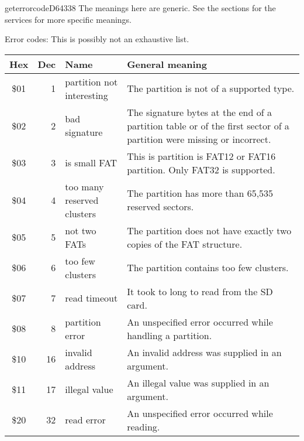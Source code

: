 \begin{hyppotrap}{geterrorcode}{D643}{38}
  The meanings here are generic. See the sections for the services for more
  specific meanings.
\item [Error codes:] This is possibly not an exhaustive list.
{
  \begin{longtable}{|c|r|l|p{8cm}|}
    \hline
    \textbf{Hex} & \textbf{Dec} & \textbf{Name} & \textbf{General meaning}\\
    \hline
    \endhead
    \index{Hyppo Error Codes!\$01}
    \$01 & 1 & \makecell[tl]{partition not \\ interesting} &
    The partition is not of a supported type.
    \\\hline
    \index{Hyppo Error Codes!\$02}
    \$02 & 2 & bad signature &
    The signature bytes at the end of a partition table or of the first sector
    of a partition were missing or incorrect.
    \\\hline
    \index{Hyppo Error Codes!\$03}
    \$03 & 3 & is small FAT &
    This is partition is FAT12 or FAT16 partition. Only FAT32 is supported.
    \\\hline
    \index{Hyppo Error Codes!\$04}
    \$04 & 4 & \makecell[tl]{too many reserved\\clusters} &
    The partition has more than 65,535 reserved sectors.
    \\\hline
    \index{Hyppo Error Codes!\$05}
    \$05 & 5 & not two FATs &
    The partition does not have exactly two copies of the FAT structure.
    \\\hline
    \index{Hyppo Error Codes!\$06}
    \$06 & 6 & too few clusters &
    The partition contains too few clusters.
    \\\hline
    \index{Hyppo Error Codes!\$07}
    \$07 & 7 & read timeout &
    It took to long to read from the SD card.
    \\\hline
    \index{Hyppo Error Codes!\$08}
    \$08 & 8 & partition error &
    An unspecified error occurred while handling a partition.
    \\\hline
    \index{Hyppo Error Codes!\$10}
    \$10 & 16 & invalid address &
    An invalid address was supplied in an argument.
    \\\hline
    \index{Hyppo Error Codes!\$11}
    \$11 & 17 & illegal value &
    An illegal value was supplied in an argument.
    \\\hline
    \index{Hyppo Error Codes!\$20}
    \$20 & 32 & read error &
    An unspecified error occurred while reading.

\end{longtable}}
\end{hyppotrap}
